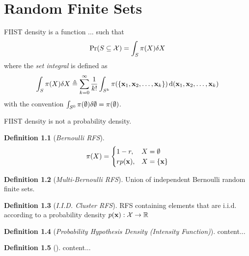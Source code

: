 \documentclass[a4paper]{scrreprt}
\theoremstyle{theorem}
\theoremstyle{definition}
\newtheorem{defn}{Definition}
\begin{document}
\chapter{Random Finite Sets}\label{ch:random_finite_sets}

FIIST density is a function ... such that 
\begin{equation}\label{eq:fiist_density}
	\mathrm{Pr}(S \subseteq \mathcal{X}) = \int_S \pi(X) \dsx[X]
\end{equation}
where the \emph{set integral} is defined as
\begin{equation}\label{eq:set_integral}
	\int_S \pi(X) \dsx[X] \triangleq \sum_{k=0}^{\infty}\frac{1}{k!}\int_{S^k} \pi(\Bqty{\inVar_1, \inVar_2, \ldots, \inVar_k}) \dx[(\inVar_1, \inVar_2, \ldots, \inVar_k)]
\end{equation}
with the convention \( \int_{S^0} \pi(\emptyset) \dsx[\emptyset] = \pi(\emptyset) \).

FIIST density is not a probability density.

\begin{defn}[\emph{Bernoulli RFS}]
\begin{equation}\label{eq:bernoulli_rfs}
	\pi(X) = 
	\begin{cases}
	1 - r, 			& X = \emptyset \\
	r p(\stVar), 	& X = \Bqty{\stVar}
	\end{cases}
\end{equation}
\end{defn}

\begin{defn}[\emph{Multi-Bernoulli RFS}]
	Union of independent Bernoulli random finite sets.
\end{defn}

\begin{defn}[\emph{I.I.D. Cluster RFS}]
	RFS containing elements that are i.i.d. according to a probability density \( p(\stVar): \stSp\to\R \)
\end{defn}

\begin{defn}[\emph{Probability Hypothesis Density (Intensity Function)}]
	content...
\end{defn}

\begin{defn}[]
	content...
\end{defn}
\end{document}

